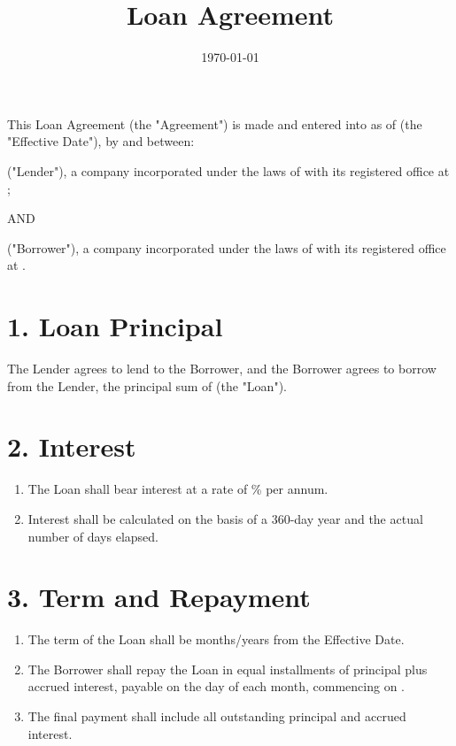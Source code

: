 \documentclass[12pt]{ctexart}
\title{Loan Agreement}
\author{}
\date{\today}
\begin{document}
\maketitle

\doublespacing

This Loan Agreement (the "Agreement") is made and entered into as of \underline{\hspace{3cm}} (the "Effective Date"), by and between:

\underline{\hspace{6cm}} ("Lender"), a company incorporated under the laws of \underline{\hspace{3cm}} with its registered office at \underline{\hspace{6cm}};

AND

\underline{\hspace{6cm}} ("Borrower"), a company incorporated under the laws of \underline{\hspace{3cm}} with its registered office at \underline{\hspace{6cm}}.

\section*{1. Loan Principal}
The Lender agrees to lend to the Borrower, and the Borrower agrees to borrow from the Lender, the principal sum of \underline{\hspace{3cm}} (the "Loan").

\section*{2. Interest}
\begin{enumerate}[label=2.\arabic*]
    \item The Loan shall bear interest at a rate of \underline{\hspace{3cm}}\% per annum.
    \item Interest shall be calculated on the basis of a 360-day year and the actual number of days elapsed.
\end{enumerate}

\section*{3. Term and Repayment}
\begin{enumerate}[label=3.\arabic*]
    \item The term of the Loan shall be \underline{\hspace{3cm}} months/years from the Effective Date.
    \item The Borrower shall repay the Loan in \underline{\hspace{2cm}} equal installments of principal plus accrued interest, payable on the \underline{\hspace{2cm}} day of each month, commencing on \underline{\hspace{3cm}}.
    \item The final payment shall include all outstanding principal and accrued interest.
\end{enumerate}
\end{document}
